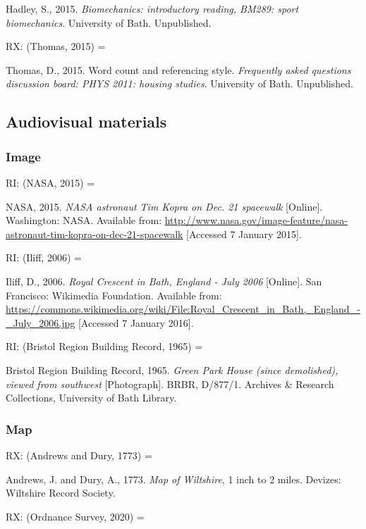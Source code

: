 Hadley, S., 2015. \emph{Biomechanics: introductory reading, BM289: sport biomechanics}. University of Bath. Unpublished.


RX: (Thomas, 2015) = \cite{thomas2015wcr}

Thomas, D., 2015. Word count and referencing style. \emph{Frequently asked questions discussion board: PHYS 2011: housing studies}. University of Bath. Unpublished.



\subsection{Audiovisual materials}

\subsubsection*{Image}

RI: (NASA, 2015) = \cite{nasa2015nat}

NASA, 2015. \emph{NASA astronaut Tim Kopra on Dec. 21 spacewalk} [Online]. Washington: NASA. Available from: \url{http://www.nasa.gov/image-feature/nasa-astronaut-tim-kopra-on-dec-21-spacewalk} [Accessed 7 January 2015].


RI: (Iliff, 2006) = \cite{iliff2006rcb}

Iliff, D., 2006. \emph{Royal Crescent in Bath, England - July 2006} [Online]. San Francisco: Wikimedia Foundation. Available from: \url{https://commons.wikimedia.org/wiki/File:Royal_Crescent_in_Bath,_England_-_July_2006.jpg} [Accessed 7 January 2016].


RI: (Bristol Region Building Record, 1965) = \cite{brbr1965gph}

Bristol Region Building Record, 1965. \emph{Green Park House (since demolished), viewed from southwest} [Photograph]. BRBR, D/877/1. Archives \& Research Collections, University of Bath Library.



\subsubsection*{Map}

RX: (Andrews and Dury, 1773) = \cite{andrews.dury1773wilts}

Andrews, J. and Dury, A., 1773. \emph{Map of Wiltshire}, 1 inch to 2 miles. Devizes: Wiltshire Record Society.


RX: (Ordnance Survey, 2020) = \cite{os2020bath}

